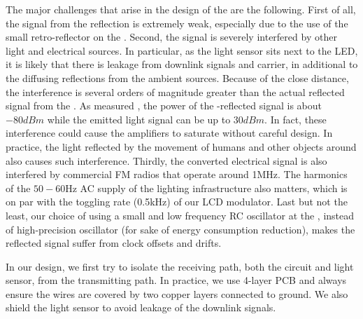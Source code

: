 The major challenges that arise in the design of the \readerrx are the following. First of all, the signal from the \vitag reflection is extremely weak, especially due to the use of the small retro-reflector on the \vitag. Second, the signal is severely interfered by other light and electrical sources. In particular, as the light sensor sits next to the LED, it is likely that there is leakage from downlink signals and carrier, in additional to the diffusing reflections from the ambient sources. Because of the close distance, the interference is several orders of magnitude greater than the actual reflected signal from the \vitag. As measured , the power of the \vitag-reflected signal is about $-80dBm$  while the \readertx emitted light signal can be up to $30dBm$. In fact, these interference could cause the \readerrx amplifiers to saturate without careful design. In practice, the light reflected by the movement of humans and other objects around also causes such interference. 
Thirdly, the converted electrical signal is also interfered by commercial FM radios that operate around 1MHz. The harmonics of the $50-60$Hz AC supply of the lighting infrastructure also matters, which is on par with the toggling rate (0.5kHz) of our LCD modulator. %
Last but not the least, our choice of using a small and low frequency RC oscillator at the \vitag, instead of high-precision oscillator (for sake of energy consumption reduction), makes the reflected signal suffer from clock offsets and drifts.   


In our design, we first try to isolate the receiving path, both the circuit and light sensor, from the transmitting path. In practice, we use 4-layer PCB and always ensure the wires are covered by two copper layers connected to ground. We also shield the light sensor to avoid leakage of the downlink signals. 

